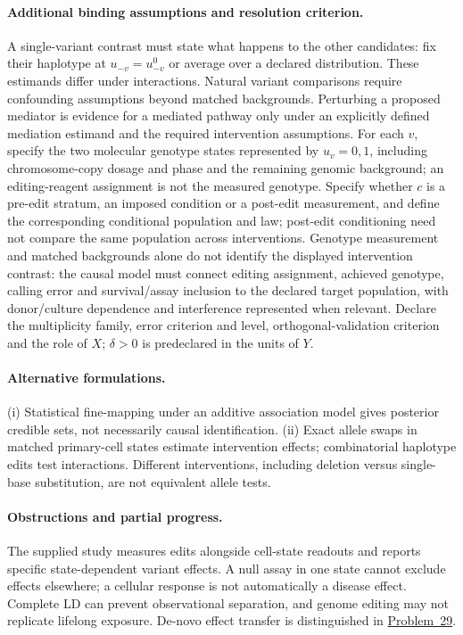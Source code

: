 \documentclass[11pt]{article}
\begin{document}
\paragraph{Additional binding assumptions and resolution criterion.} A single-variant contrast must state what happens to the other candidates: fix their haplotype at $u_{-v}=u^0_{-v}$ or average over a declared distribution. These estimands differ under interactions. Natural variant comparisons require confounding assumptions beyond matched backgrounds. Perturbing a proposed mediator is evidence for a mediated pathway only under an explicitly defined mediation estimand and the required intervention assumptions. For each $v$, specify the two molecular genotype states represented by $u_v=0,1$, including chromosome-copy dosage and phase and the remaining genomic background; an editing-reagent assignment is not the measured genotype. Specify whether $c$ is a pre-edit stratum, an imposed condition or a post-edit measurement, and define the corresponding conditional population and law; post-edit conditioning need not compare the same population across interventions. Genotype measurement and matched backgrounds alone do not identify the displayed intervention contrast: the causal model must connect editing assignment, achieved genotype, calling error and survival/assay inclusion to the declared target population, with donor/culture dependence and interference represented when relevant. Declare the multiplicity family, error criterion and level, orthogonal-validation criterion and the role of $X$; $\delta>0$ is predeclared in the units of $Y$.

\paragraph{Alternative formulations.} (i) Statistical fine-mapping under an additive association model gives posterior credible sets, not necessarily causal identification. (ii) Exact allele swaps in matched primary-cell states estimate intervention effects; combinatorial haplotype edits test interactions. Different interventions, including deletion versus single-base substitution, are not equivalent allele tests.
\paragraph{Obstructions and partial progress.} The supplied study measures edits alongside cell-state readouts and reports specific state-dependent variant effects. A null assay in one state cannot exclude effects elsewhere; a cellular response is not automatically a disease effect. Complete LD can prevent observational separation, and genome editing may not replicate lifelong exposure. De-novo effect transfer is distinguished in \href{https://we-solve.github.io/problems/predicting-de-novo-mutation-effects-2438888c/}{Problem~29}.
\end{document}
